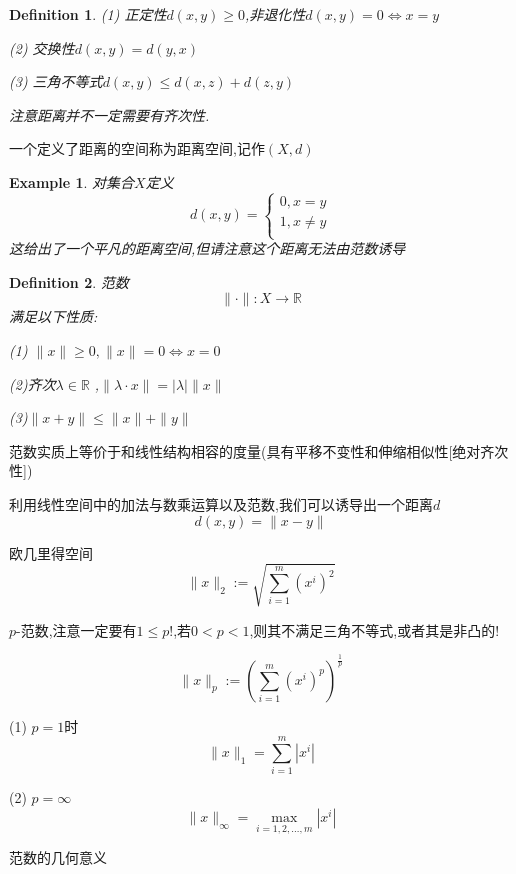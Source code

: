 \documentclass[11pt,hyperref,a4paper,UTF8]{ctexart}
\newtheorem{example}{Example}[subsection]
\newtheorem{definition}{Definition}[subsection]
\newcommand{\RR}{\mathbb{R}}
\newcommand{\parameter}[1]{\left(#1\right)}
\begin{document}
\begin{CJK}{UTF8}{gkai}
\begin{definition}
  (1) 正定性$d(x,y) \geq 0$,非退化性$d(x,y) = 0 \Leftrightarrow x = y$

  (2) 交换性$d(x,y) = d(y,x)$

  (3) 三角不等式$d(x,y) \leq d(x,z) + d(z,y)$

  注意距离并不一定需要有齐次性.
\end{definition}

一个定义了距离的空间称为距离空间,记作$(X,d)$

\begin{example}
  对集合$X$定义
  \[d(x,y) = \begin{cases}
    0,x = y\\
    1,x\neq y\\
  \end{cases}\]
  这给出了一个平凡的距离空间,但请注意这个距离无法由范数诱导
\end{example}

\begin{definition}
  范数\\
  
  \[\|\cdot\|: X \to \RR\]
  满足以下性质:

  (1) $\|x\| \geq 0, \|x\| = 0 \Leftrightarrow x = 0$

  (2)齐次$\lambda \in \RR$ ,$\|\lambda\cdot x\| = |\lambda| \|x\|$

  (3)$\|x + y\| \leq \|x\| + \|y\|$
\end{definition}
范数实质上等价于和线性结构相容的度量(具有平移不变性和伸缩相似性[绝对齐次性])

利用线性空间中的加法与数乘运算以及范数,我们可以诱导出一个距离$d$
\[d(x,y) = \|x - y\|\]

欧几里得空间
\[\|x\|_2 := \sqrt{\sum_{i = 1}^{m} (x^i)^2}\]

$p$-范数,注意一定要有$1 \leq p$!,若$0 < p < 1$,则其不满足三角不等式,或者其是非凸的!

\[\|x\|_p := \parameter{\sum_{i = 1}^{m} (x^i)^p}^{\frac{1}{p}}\]


(1) $p = 1$时
\[\|x\|_1 = \sum_{i = 1}^{m} |x^i|\]

(2) $p = \infty$
\[\|x\|_\infty = \max_{i = 1,2,\ldots,m} |x^i|\]

范数的几何意义

\begin{center}
  

\end{center}
\end{CJK}
\end{document}
